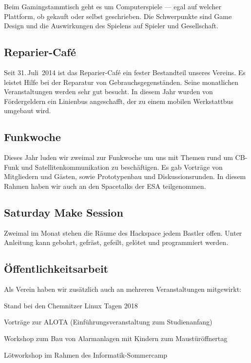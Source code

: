 \documentclass[ngerman]{scrartcl}
\begin{document}
Beim Gamingstammtisch geht es um Computerspiele — egal auf welcher
Plattform, ob gekauft oder selbst geschrieben. Die Schwerpunkte sind
Game Design und die Auswirkungen des Spielens auf Spieler und
Gesellschaft.

\subsection{Reparier-Café}

Seit 31.\,Juli~2014 ist das Reparier-Café ein fester Bestandteil unseres Vereins.
Es leistet Hilfe bei der Reparatur von Gebrauchsgegenständen.
Seine monatlichen Veranstaltungen werden sehr gut besucht. In diesem Jahr wurden
von Fördergeldern ein Linienbus angeschafft, der zu einem mobilen Werkstattbus
umgebaut wird.

\subsection{Funkwoche}

Dieses Jahr luden wir zweimal zur Funkwoche um uns mit Themen rund um CB-Funk und Satellitenkommunikation
zu beschäftigen. Es gab Vorträge von Mitgliedern und Gästen, sowie Prototypenbau und Diskussionsrunden.
In diesem Rahmen haben wir auch an den Spacetalks der ESA teilgenommen.

\subsection{Saturday Make Session}

Zweimal im Monat stehen die Räume des Hackspace jedem Bastler offen. Unter
Anleitung kann gebohrt, gefräst, gefeilt, gelötet und programmiert werden.

\subsection{Öffentlichkeitsarbeit}
Als Verein haben wir zusätzlich auch an mehreren Veranstaltungen mitgewirkt:
\begin{compactitem}
	\item Stand bei den Chemnitzer Linux Tagen 2018
	\item Vorträge zur ALOTA (Einführungsveranstaltung zum Studienanfang)
	\item Workshop zum Bau von Alarmanlagen mit Kindern zum Maustüröffnertag
	\item Lötworkshop im Rahmen des Informatik-Sommercamp
\end{compactitem}
\end{document}
